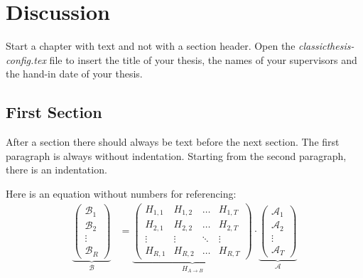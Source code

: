 
\chapter{Discussion}\label{ch:Discussion} %
\glsresetall %

Start a chapter with text and not with a section header. Open the
\emph{classicthesis-config.tex} file to insert the title of your thesis, the
names of your supervisors and the hand-in date of your thesis.

\section{First Section}
\label{sec:first_section}

After a section there should always be text before the next section. The first
paragraph is always without indentation. Starting from the second paragraph,
there is an indentation.

Here is an equation without numbers for referencing:
\begin{align*}
\underbrace{\begin{pmatrix}\mathcal{B}_1\\\mathcal{B}_2\\\vdots\\\mathcal{B}_R\end{pmatrix}}_\mathcal{B} &= \underbrace{\begin{pmatrix}H_{1,1} & H_{1,2} & \hdots & H_{1,T}\\H_{2,1} & H_{2,2} & \hdots & H_{2,T}\\\vdots & \vdots & \ddots & \vdots\\H_{R,1} & H_{R,2} & \hdots & H_{R,T}\end{pmatrix}}_{H_{A\rightarrow B}}\cdot \underbrace{\begin{pmatrix}\mathcal{A}_1\\\mathcal{A}_2\\\vdots\\\mathcal{A}_T\end{pmatrix}}_\mathcal{A}
\end{align*}

